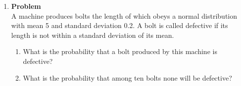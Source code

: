\documentclass[12pt]{article}
\newenvironment{Ex}{\textbf{Problem}\vspace{.75em}\\}{}
\begin{document}
\begin{enumerate}
\begin{Ex}
\begin{equation}
\begin{aligned}
          & \frac{11}{12} && 2 \le b < 3 \\
          & 1 && 2 \le b \\
        \end{aligned} \right.
    \end{equation}
    \begin{enumerate}
    \item Find $P(X=i)$, for $i=1,2,3$.
    \item Find $P\left(\frac{1}{2} < X < \frac{2}{3}\right)$
    \end{enumerate}
    \begin{solution} \hfill
      \begin{enumerate}
      \item CDFs do not have values at any particular point; instead
        they are calculated as areas from $-\infty$ or a given
        value. Thus, the value at any specific $X=i$ is infinitesimal.
      \item Since we already have the CDF, we can simply use
        subtraction to find the the requested probability.
        \begin{equation}
          \label{eq:3b-sol}
          \begin{aligned}
            P\left(\frac{1}{2} < X < \frac{2}{3}\right) &=
            \frac{\frac{2}{3}}{4} - \frac{\frac{1}{2}}{4} \\
            \implies P\left(\frac{1}{2} < X < \frac{2}{3}\right) &=
            0.0417.
          \end{aligned}
        \end{equation}
      \end{enumerate}
    \end{solution}
  \end{Ex}
  \pagebreak[4]
\item
  \begin{Ex}
    A machine produces bolts the length of which obeys a normal
    distribution with mean 5 and standard deviation 0.2. A bolt is
    called defective if its length is not within a standard deviation
    of its mean.
    \begin{enumerate}
    \item What is the probability that a bolt produced by this machine
      is defective?
    \item What is the probability that among ten bolts none will be
      defective?
    \end{enumerate}
    \begin{solution} \hfill

\end{solution}
\end{Ex}
\end{enumerate}
\end{document}
